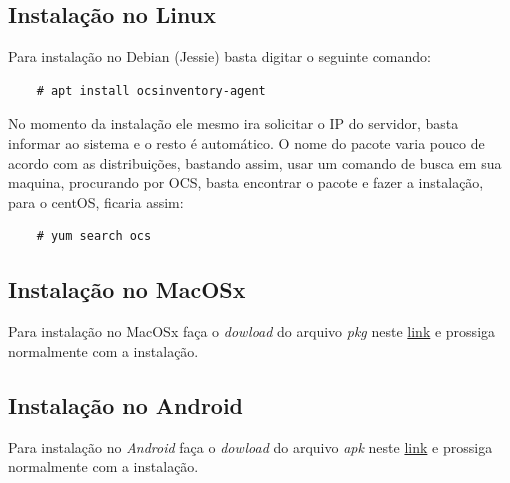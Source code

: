 \documentclass[
               12pt,             %
               a4paper,          %
               chapter=TITLE,    %
               section=TITLE,    %
               english,
               brazil            
]{article}
\begin{document}
\pagebreak

\subsection{Instalação no Linux}

Para instalação no Debian (Jessie) basta digitar o seguinte comando:

\begin{verbatim}
	# apt install ocsinventory-agent
\end{verbatim}

No momento da instalação ele mesmo ira solicitar o IP do servidor, basta informar ao sistema e o resto é automático. O nome do pacote varia pouco de acordo com as distribuições, bastando assim, usar um comando de busca em sua maquina, procurando por OCS, basta encontrar o pacote e fazer a instalação, para o centOS, ficaria assim:

\begin{verbatim}
	# yum search ocs
\end{verbatim}

\subsection{Instalação no MacOSx}

Para instalação no MacOSx faça o \textit{dowload} do arquivo \textit{pkg} neste \href{https://github.com/OCSInventory-NG/UnixAgent/releases/download/2.1.1/Ocsinventory_Agent_MacOSX-2.1.1.pkg.zip}{link} e prossiga normalmente com a instalação.

\subsection{Instalação no Android}

Para instalação no \textit{Android} faça o \textit{dowload} do arquivo \textit{apk} neste \href{https://github.com/OCSInventory-NG/AndroidAgent/releases/download/2.3/OCSNG-Android-Agent-2.3.0.apk}{link} e prossiga normalmente com a instalação.
\end{document}
